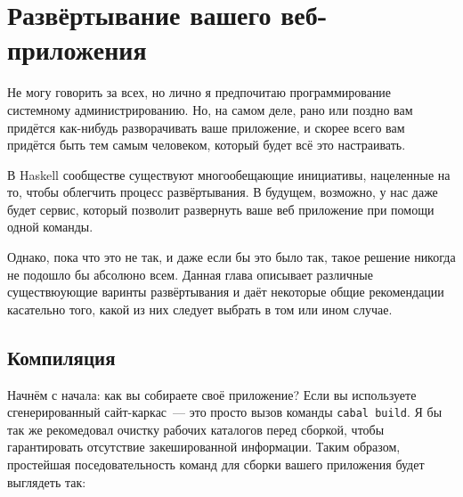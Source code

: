 \chapter{Развёртывание вашего веб-приложения}
%
%

Не могу говорить за всех, но лично я предпочитаю программирование системному администрированию. Но, на самом деле, рано или поздно вам придётся как-нибудь разворачивать ваше приложение, и скорее всего вам придётся быть тем самым человеком, который будет всё это настраивать. 

%
В Haskell сообществе существуют многообещающие инициативы, нацеленные на то, чтобы облегчить процесс развёртывания. В будущем, возможно, у нас даже будет сервис, который позволит развернуть ваше веб приложение при помощи одной команды.

%
Однако, пока что это не так, и даже если бы это было так, такое решение никогда не подошло бы абсолюно всем. Данная глава описывает различные существюующие варинты развёртывания и даёт некоторые общие рекомендации касательно того, какой из них следует выбрать в том или ином случае.

\section{Компиляция}
%
%
Начнём с начала: как вы собираете своё приложение? Если вы используете сгенерированный сайт-каркас~--- это просто вызов команды \lstinline{cabal build}. Я бы так же рекомедовал очистку рабочих каталогов перед сборкой, чтобы гарантировать отсутствие закешированной информации. Таким образом, простейшая поседовательность команд для сборки вашего приложения будет выглядеть так:

